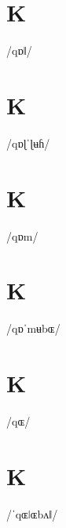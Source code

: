 \documentclass[10pt,a4paper,twoside]{book}
\begin{document}
\section*{K}

\begin{multicols}{3}
 {/qɒǁ/} {}
\end{multicols}

\section*{K}

\begin{multicols}{3}
 {/qɒɭˈɭʉɦ/} {}
\end{multicols}

\section*{K}

\begin{multicols}{3}
 {/qɒm/} {}
\end{multicols}

\section*{K}

\begin{multicols}{3}
 {/qɒˈmʉbɶ/} {}
\end{multicols}

\section*{K}

\begin{multicols}{3}
 {/qɶ/} {}
\end{multicols}

\section*{K}

\begin{multicols}{3}
 {/ˈqɶǀɶbʌǁ/} {}
\end{multicols}
\end{document}
